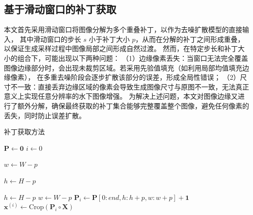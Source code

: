 \subsection{基于滑动窗口的补丁获取}
本文首先采用滑动窗口将图像分解为多个重叠补丁，以作为去噪扩散模型的直接输入，
其中滑动窗口的步长 $s$ 小于补丁大小 $p$，从而在分解的补丁之间形成重叠，以保证生成采样过程中图像局部之间形成自然过渡。
然而，在特定步长和补丁大小的组合下，可能出现以下两种问题：
（1）边缘像素丢失：当窗口无法完全覆盖图像边缘部分时，会出现未裁剪区域。若采用先验值填充（如利用局部均值填充边缘像素），
在多重去噪阶段会逐步扩散该部分的误差，形成全局性错误；
（2）尺寸不一致：直接丢弃边缘区域的像素会导致生成图像尺寸与原图不一致，无法真正意义上实现任意分辨率的水下图像增强。
为解决上述问题，本文对图像边缘又进行了额外分解，确保最终获取的补丁集合能够完整覆盖整个图像，避免任何像素的丢失，同时防止误差扩散。
\begin{algorithm}[ht]
\caption{补丁获取方法}
\label{alg:patch}


$\bm{P} \gets \mathbf{0}$ \quad {}
$i \gets 0$ \quad {}


$w \gets W - p$\;


$h \gets H - p$\;


$h \gets H - p$\;
$w \gets W - p$\;
$\bm{P}_i \gets \bm{P}[0:end, h:h + p, w:w + p] + \mathbf{1}$\;
$\mathbf{x}^{(i)} \gets \text{Crop}(\bm{P}_i \circ \bm{X})$\;
\end{algorithm}

